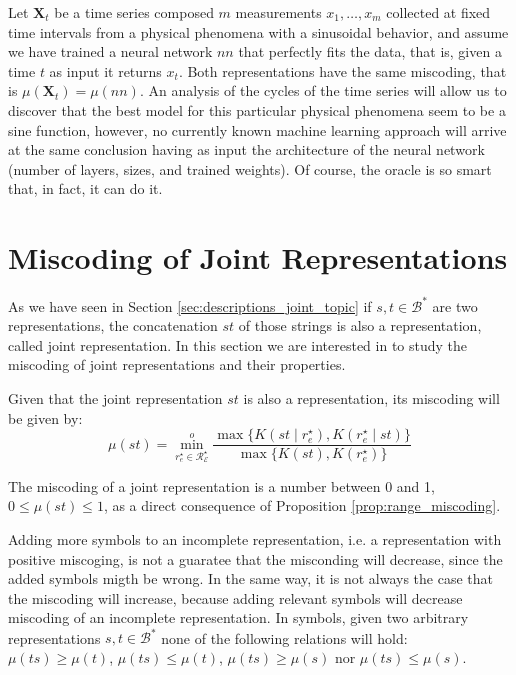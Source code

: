 \begin{example}
Let $\mathbf{X}_t$ be a time series composed $m$ measurements $x_1, \ldots, x_m$ collected at fixed time intervals from a physical phenomena with a sinusoidal behavior, and assume we have trained a neural network $nn$ that perfectly fits the data, that is, given a time $t$ as input it returns $x_t$. Both representations have the same miscoding, that is $\mu(\mathbf{X}_t) = \mu(nn)$. An analysis of the cycles of the time series will allow us to discover that the best model for this particular physical phenomena seem to be a sine function, however, no currently known machine learning approach will arrive at the same conclusion having as input the architecture of the neural network (number of layers, sizes, and trained weights). Of course, the oracle is so smart that, in fact, it can do it.
\end{example}

%
%

\section{Miscoding of Joint Representations}
\label{sec:joint_miscoding}

As we have seen in Section \ref{sec:descriptions_joint_topic} if $s, t \in \mathcal{B}^\ast$ are two representations, the concatenation $st$ of those strings is also a representation, called joint representation. In this section we are interested in to study the miscoding of joint representations and their properties.

Given that the joint representation $st$ is also a representation, its miscoding will be given by:
\[
\mu(st) = \overset{o}{ \underset{ r^\star_e \in \mathcal{R}^\star_\mathcal{E} } \min} \frac{ \max\{ K \left( st \mid r^\star_e \right), K \left( r^\star_e \mid st \right) \} } { \max\{ K \left( st \right), K \left( r^\star_e \right) \} }
\]

The miscoding of a joint representation is a number between 0 and 1, $0 \leq \mu(st) \leq 1$, as a direct consequence of Proposition \ref{prop:range_miscoding}.

Adding more symbols to an incomplete representation, i.e. a representation with positive miscoging, is not a guaratee that the misconding will decrease, since the added symbols migth be wrong. In the same way, it is not always the case that the miscoding will increase, because adding relevant symbols will decrease miscoding of an incomplete representation. In symbols, given two arbitrary representations $s, t \in \mathcal{B}^\ast$ none of the following relations will hold: $\mu(ts) \geq \mu(t)$, $\mu(ts) \leq \mu(t)$, $\mu(ts) \geq \mu(s)$ nor $\mu(ts) \leq \mu(s)$.

